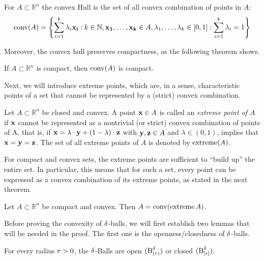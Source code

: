 \begin{thm} \label{thm-conv-hull-all-conv-combs}
	For $A \subset \mathbb{R}^{n}$ the convex Hull is the set of all convex combination of points in $A$:
	$$\operatorname{conv}(A) =  \left \{\sum_{i=1}^{k} \lambda_i \mathbf{x_i} : k \in \mathbb{N}, \mathbf{x_1}, \dots, \mathbf{x_k} \in A, \lambda_1, \dots, \lambda_k \in [0,1]: \sum_{i=1}^{k} \lambda_i = 1 \right \}$$
\end{thm}

Moreover, the convex hull preserves compactness, as the following theorem shows.

\begin{thm} \label{thm-compact-hull-compact}
	If $A \subset \mathbb{R}^{n}$ is compact, then $\operatorname{conv}(A)$ is compact.
\end{thm}
Next, we will introduce extreme points, which are, in a sense, characteristic points of a set that cannot be represented by a (strict) convex combination.

\begin{defi}\label{def-extreme-point}  %
  Let $A \subset \mathbb{R}^{n}$ be closed and convex. A point $\mathbf{x} \in A$ is called an \emph{extreme point of $A$} if $\mathbf{x}$ cannot be represented as a nontrivial (or strict) convex combination of points of A, that is, if $\mathbf{x} = \lambda \cdot \mathbf{y} + (1-\lambda) \cdot \mathbf{z}$ with $\mathbf{y}, \mathbf{z} \in A$ and $\lambda \in (0,1)$, implies that $\mathbf{x} = \mathbf{y} = \mathbf{z}$. The set of all extreme points of $A$ is denoted by $\operatorname{extreme}(A)$.
\end{defi}

For compact and convex sets, the extreme points are sufficient to ``build up'' the entire set.
In particular, this means that for such a set, every point can be expressed as a convex combination of its extreme points, as stated in the next theorem.

\begin{thm} \label{thm-minkowski}
	Let $A \subset \mathbb{R}^{n}$ be compact and convex. Then $A = \operatorname{conv} (\operatorname{extreme} A)$.
\end{thm}

Before proving the convexity of $\operatorname{\delta}$-balls, we will first establish two lemmas that will be needed in the proof.
The first one is the openness/closedness of $\operatorname{\delta}$-balls.

\begin{lem} \label{lemma-delta-balls-closed}
	For every radius $r > 0$, the $\operatorname{\delta}$-Balls are open $(\operatorname{B}^{\operatorname{\delta}}_{(r)})$ or closed $(\operatorname{B}^{\operatorname{\delta}}_{[r]})$.
\end{lem}

